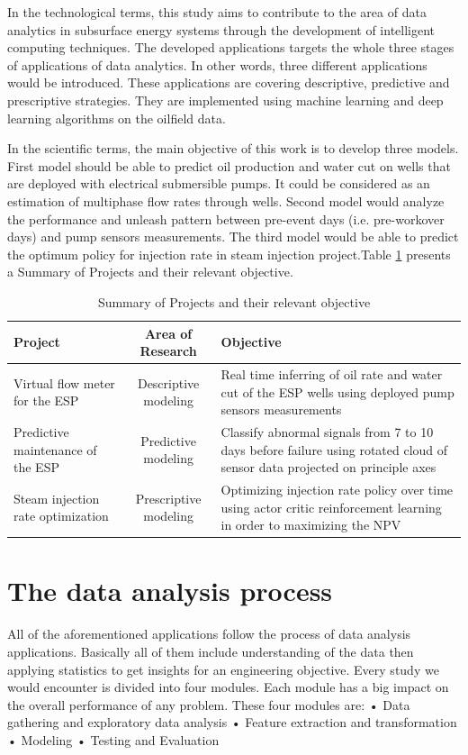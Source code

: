 In the technological terms, this study aims to contribute to the area of data analytics in subsurface energy systems through the development of intelligent computing techniques. The developed applications targets the whole three stages of applications of data analytics. In other words, three different applications would be introduced. These applications are covering descriptive, predictive and prescriptive strategies. They are implemented using machine learning and deep learning algorithms on the oilfield data.

In the scientific terms, the main objective of this work is to develop three  models. First model should be able to predict oil production and water cut on wells that are deployed with electrical submersible pumps. It could be considered as an estimation of multiphase flow rates through wells. Second model would analyze the performance and unleash pattern between pre-event days (i.e. pre-workover days) and pump sensors measurements. The third model would be able to predict the optimum policy for injection rate in steam injection project.Table \ref{tab:workflowtable} presents a Summary of Projects and their relevant objective.

\begin{table}[]
    \centering
    \begin{tabular}{|p{3cm}|c|p{6cm}|}
        \hline
        Project & Area of Research & Objective \\ \hline
        Virtual flow meter for the \ac{ESP} & Descriptive modeling &  Real time inferring of oil rate and water cut of the \ac{ESP} wells using deployed pump sensors measurements \\     \hline
        Predictive maintenance of the \ac{ESP}  & Predictive modeling & Classify abnormal signals from 7 to 10 days before failure using rotated cloud of sensor data projected on principle axes  \\    \hline
        Steam injection rate optimization & Prescriptive modeling & Optimizing injection rate policy over time using actor critic reinforcement learning in order to maximizing the \ac{NPV}\\ \hline
    \end{tabular}
\caption{Summary of Projects and their relevant objective}
\label{tab:workflowtable}
\end{table}
   
\section{The data analysis process}
All of the aforementioned applications follow the process of data analysis applications. Basically all of them include understanding of the data then applying statistics to get insights for an engineering objective. Every study we would encounter is divided into four modules. Each module has a big impact on the overall performance of any problem. These four modules are:
•	Data gathering and exploratory data analysis
•	Feature extraction and transformation
•	Modeling 
•	Testing and Evaluation 


